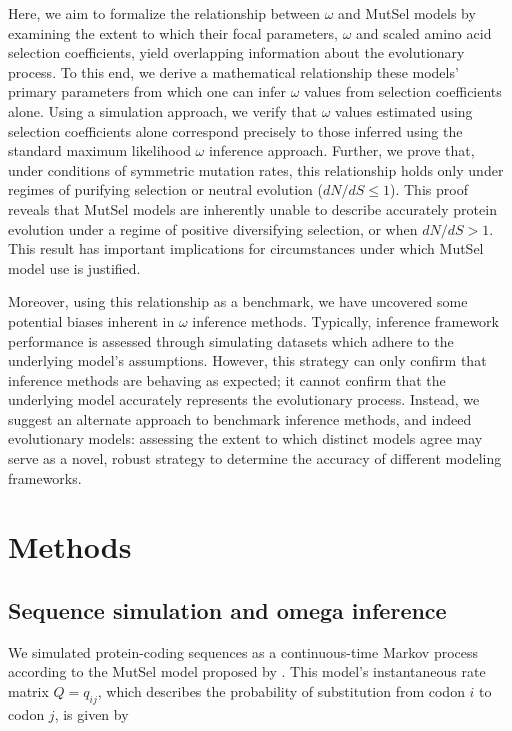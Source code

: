 \documentclass[11pt]{article}
\begin{document}
Here, we aim to formalize the relationship between $\omega$ and MutSel models by examining the extent to which their focal parameters, $\omega$ and scaled amino acid selection coefficients, yield overlapping information about the evolutionary process. To this end, we derive a mathematical relationship these models' primary parameters from which one can infer $\omega$ values from selection coefficients alone. Using a simulation approach, we verify that $\omega$ values estimated using selection coefficients alone correspond precisely to those inferred using the standard maximum likelihood $\omega$ inference approach. Further, we prove that, under conditions of symmetric mutation rates, this relationship holds only under regimes of purifying selection or neutral evolution ($dN/dS \leq 1$). This proof reveals that MutSel models are inherently unable to describe accurately protein evolution under a regime of positive diversifying selection, or when $dN/dS > 1$. This result has important implications for circumstances under which MutSel model use is justified.

Moreover, using this relationship as a benchmark, we have uncovered some potential biases inherent in $\omega$ inference methods. Typically, inference framework performance is assessed through simulating datasets which adhere to the underlying model's assumptions. However, this strategy can only confirm that inference methods are behaving as expected; it cannot confirm that the underlying model accurately represents the evolutionary process. Instead, we suggest an alternate approach to benchmark inference methods, and indeed evolutionary models: assessing the extent to which distinct models agree may serve as a novel, robust strategy to determine the accuracy of different modeling frameworks. 


\section*{Methods}

\subsection*{Sequence simulation and omega inference}
We simulated protein-coding sequences as a continuous-time Markov
process \cite{Yang2006} according to the MutSel model proposed by \cite{HalpernBruno1998}. This model's instantaneous rate matrix $Q = q_{ij}$, which describes the probability of substitution from codon $i$ to codon $j$, is given by 
\end{document}
